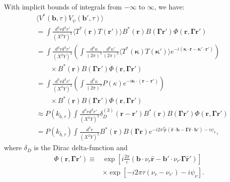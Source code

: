 \documentclass[twocolumn,apj,numberedappendix]{emulateapj}
\renewcommand\[{\begin{equation}}
\renewcommand\]{\end{equation}}
\begin{document}
With implicit bounds of integrals from $-\infty$ to $\infty$, we have:
\begin{eqnarray}
 &&\langle V^{*}(\boldsymbol{b},\tau)V_{\psi}(\boldsymbol{b'},\tau)\rangle \nonumber \\
 && =\int \frac{d^{3}rd^{3}r'}{(X^2Y)^2}\langle T^{*}(\boldsymbol{r})T(\boldsymbol{r'})\rangle B^{*}(\boldsymbol{r})B(\boldsymbol{\Gamma} \boldsymbol{r'})\Phi(\boldsymbol{r},\boldsymbol{\Gamma} \boldsymbol{r'}) \nonumber \\
 &&  =\int \frac{d^{3}rd^{3}r'}{(X^2Y)^2}\left(\int\frac{d^{3}\kappa}{(2\pi)^{3}}\frac{d^{3}\kappa'}{(2\pi)^{3}}\langle T^{*}(\boldsymbol{\kappa})T(\boldsymbol{\kappa'})\rangle e^{-i(\boldsymbol{\kappa}\cdot \boldsymbol{r}-\boldsymbol{\kappa'}\cdot\boldsymbol{r'})}\right) \nonumber \\
 && \qquad  \times B^{*}(\boldsymbol{r})B(\boldsymbol{\Gamma} \boldsymbol{r'})\Phi(\boldsymbol{r},\boldsymbol{\Gamma} \boldsymbol{r'})\nonumber \\
 && =\int \frac{d^{3}rd^{3}r'}{(X^2Y)^2}\left(\int\frac{d^{3}\kappa}{(2\pi)^{3}}P(\kappa)e^{-i\boldsymbol{\kappa}\cdot(\boldsymbol{r}-\boldsymbol{r'})}\right) \nonumber \\
 && \qquad \times B^{*}(\boldsymbol{r})B(\boldsymbol{\Gamma} \boldsymbol{r'})\Phi(\boldsymbol{r},\boldsymbol{\Gamma} \boldsymbol{r'}) \nonumber \\
 && \approx P(k_{\bar{b}, \tau})\int \frac{d^{3}rd^{3}r'}{(X^2Y)^2} \delta_{D}^{(3)}(\boldsymbol{r}-\boldsymbol{r'})B^{*}(\boldsymbol{r})B(\boldsymbol{\Gamma} \boldsymbol{r'}) \Phi(\boldsymbol{r},\boldsymbol{\Gamma} \boldsymbol{r'}) \nonumber \\
 && = P(k_{\bar{b}, \tau})\int \frac{d^{3}r}{(X^2Y)^2}B^{*}(\boldsymbol{r})B(\boldsymbol{\Gamma} \boldsymbol{r}) e^{-i2\pi\frac{\nu_{r}}{c}\left(\hat{\boldsymbol{r}}\cdot\boldsymbol{b}-\boldsymbol{\Gamma} \hat{\boldsymbol{r}}\cdot\boldsymbol{b'}\right)-i\psi_{\nu}}, \qquad
\label{eq:main}
\end{eqnarray}
where $\delta_D$ is the Dirac delta-function and
\begin{eqnarray}
\Phi(\boldsymbol{r},\boldsymbol{\Gamma} \boldsymbol{r'})\equiv &\exp\left[i\frac{2\pi}{c}\left(\boldsymbol{b}\cdot\nu_{r}\hat{\boldsymbol{r}}-\boldsymbol{b'}\cdot\nu_{r'}\boldsymbol{\Gamma}\hat{\boldsymbol{r}}'\right)\right] \nonumber \\
& \times \exp\left[-i2\pi\tau\left(\nu_{r}-\nu_{r'}\right)-i\psi_{\nu}\right].
\end{eqnarray}
%
\end{document}
